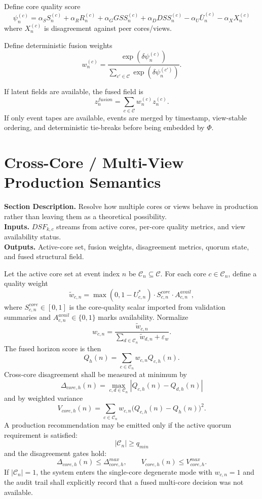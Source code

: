 \documentclass[11pt]{report}
\newcommand{\meta}[3]{\textbf{Section Description.} #1\\
\textbf{Inputs.} #2\\
\textbf{Outputs.} #3\par}
\begin{document}
Define core quality score
\[
\psi_n^{(c)} = \alpha_S S_n^{(c)} + \alpha_R R_n^{(c)} + \alpha_G GSS_n^{(c)} + \alpha_D DSS_n^{(c)} - \alpha_U \bar U_n^{(c)} - \alpha_X X_n^{(c)}
\]
where $X_n^{(c)}$ is disagreement against peer cores/views.

Define deterministic fusion weights
\[
w_n^{(c)} = \frac{\exp(\delta\psi_n^{(c)})}{\sum_{c'\in\mathcal{C}}\exp(\delta\psi_n^{(c')})}.
\]

If latent fields are available, the fused field is
\[
z_n^{fusion}=\sum_{c\in\mathcal{C}} w_n^{(c)} z_n^{(c)}.
\]
If only event tapes are available, events are merged by timestamp, view-stable ordering, and deterministic tie-breaks before being embedded by $\Phi$.


\section{Cross-Core / Multi-View Production Semantics}
\meta{Resolve how multiple cores or views behave in production rather than leaving them as a theoretical possibility.}{$DSF_{k,c}$ streams from active cores, per-core quality metrics, and view availability status.}{Active-core set, fusion weights, disagreement metrics, quorum state, and fused structural field.}

Let the active core set at event index $n$ be $\mathcal{C}_n\subseteq\mathcal{C}$. For each core $c\in\mathcal{C}_n$, define a quality weight
\[
\tilde w_{c,n}=\max(0,1-U^{\ast}_{c,n})\cdot S^{core}_{c,n}\cdot A^{avail}_{c,n},
\]
where $S^{core}_{c,n}\in[0,1]$ is the core-quality scalar imported from validation summaries and $A^{avail}_{c,n}\in\{0,1\}$ marks availability. Normalize
\[
w_{c,n}=\frac{\tilde w_{c,n}}{\sum_{d\in\mathcal{C}_n}\tilde w_{d,n}+\varepsilon_w}.
\]
The fused horizon score is then
\[
Q_h(n)=\sum_{c\in\mathcal{C}_n} w_{c,n}Q_{c,h}(n).
\]
Cross-core disagreement shall be measured at minimum by
\[
\Delta_{core,h}(n)=\max_{c,d\in\mathcal{C}_n}|Q_{c,h}(n)-Q_{d,h}(n)|
\]
and by weighted variance
\[
V_{core,h}(n)=\sum_{c\in\mathcal{C}_n}w_{c,n}\big(Q_{c,h}(n)-Q_h(n)\big)^2.
\]
A production recommendation may be emitted only if the active quorum requirement is satisfied:
\[
|\mathcal{C}_n|\ge q_{min}
\]
and the disagreement gates hold:
\[
\Delta_{core,h}(n)\le \Delta_{core,h}^{max},\qquad V_{core,h}(n)\le V_{core,h}^{max}.
\]
If $|\mathcal{C}_n|=1$, the system enters the single-core degenerate mode with $w_{c,n}=1$ and the audit trail shall explicitly record that a fused multi-core decision was not available.
\end{document}
